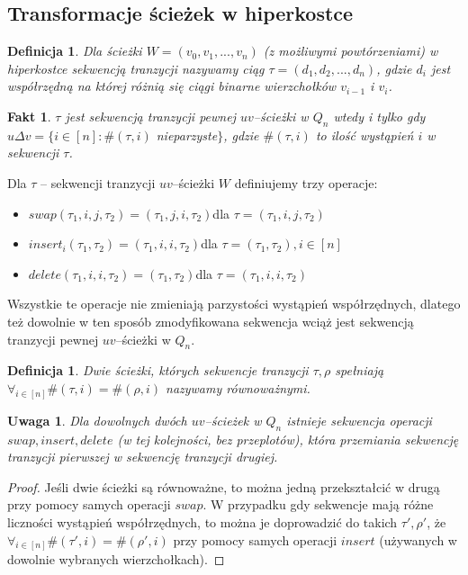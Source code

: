 \documentclass{pracamgr}
\newtheorem{defi}[theorem]{Definicja}
\newtheorem{remark}[theorem]{Uwaga}
\newtheorem{fact}[theorem]{Fakt}
\begin{document}
  \subsection{Transformacje ścieżek w hiperkostce}
   \begin{defi}\label{sekwencja tranzycji}
     Dla ścieżki $W=(v_0,v_1,...,v_n)$ (z możliwymi powtórzeniami) w hiperkostce \emph{sekwencją tranzycji} nazywamy ciąg $\tau=(d_1,d_2,...,d_n)$,
     gdzie $d_i$ jest współrzędną na której różnią się ciągi binarne wierzchołków $v_{i-1}$ i $v_i$.
    \end{defi}
    \begin{fact}\label{sekwencja tranzycji - parzystość}
     $\tau$ jest sekwencją tranzycji pewnej $uv$--ścieżki w $Q_n$ wtedy i tylko gdy\newline
     $u\Delta v=\{i\in[n]:\#(\tau,i)$ nieparzyste$\}$,
     gdzie $\#(\tau,i)$ to ilość wystąpień $i$ w sekwencji $\tau$.
    \end{fact}
    \noindent
    Dla $\tau$ -- sekwencji tranzycji $uv$--ścieżki $W$ definiujemy trzy operacje:
    \begin{itemize}
     \item $swap(\tau_1,i,j,\tau_2)=(\tau_1,j,i,\tau_2)$\quad dla $\tau=(\tau_1,i,j,\tau_2)$
     \item $insert_i(\tau_1,\tau_2)=(\tau_1,i,i,\tau_2)$\quad dla $\tau=(\tau_1,\tau_2),i\in[n]$
     \item $delete(\tau_1,i,i,\tau_2)=(\tau_1,\tau_2)$\quad dla $\tau=(\tau_1,i,i,\tau_2)$
    \end{itemize}
    Wszystkie te operacje nie zmieniają parzystości wystąpień współrzędnych, dlatego też dowolnie w ten sposób zmodyfikowana sekwencja
    wciąż jest sekwencją tranzycji pewnej $uv$--ścieżki w $Q_n$.
    \begin{defi}\label{sciezki rownowazne}
     Dwie ścieżki, których sekwencje tranzycji $\tau,\rho$ spełniają $\forall_{i\in[n]}\#(\tau,i)=\#(\rho,i)$ nazywamy \emph{równoważnymi}.
    \end{defi}
    \begin{remark}\label{przeksztalcanie sciezek}
     Dla dowolnych dwóch $uv$--ścieżek w $Q_n$ istnieje sekwencja operacji\newline
     $swap, insert, delete$ (w tej kolejności, bez przeplotów),
     która przemiania sekwencję tranzycji pierwszej w sekwencję tranzycji drugiej.
    \end{remark}
    \begin{proof}
     Jeśli dwie ścieżki są równoważne, to można jedną przekształcić w drugą przy pomocy samych operacji $swap$.\newline
     W przypadku gdy sekwencje mają różne liczności wystąpień współrzędnych, to można je doprowadzić do takich $\tau',\rho'$,
     że $\forall_{i\in[n]}\#(\tau',i)=\#(\rho',i)$ przy pomocy samych operacji $insert$ (używanych w dowolnie wybranych wierzchołkach).
    \end{proof}
\end{document}

